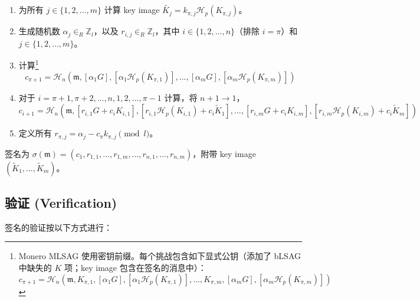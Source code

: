 \begin{enumerate}
	\item 为所有 \(j \in \{1, 2, ..., m\}\) 计算 key image \(\tilde{K_j} = k_{\pi, j} \mathcal{H}_p(K_{\pi, j})\)。

	\item 生成随机数 \(\alpha_j \in_R \mathbb{Z}_l\)，以及 \(r_{i, j} \in_R \mathbb{Z}_l\)，其中 \(i \in \{1, 2, ..., n\}\)（排除 \(i = \pi\)）和 \(j \in \{1, 2, ..., m\}\)。

	\item 计算\footnote{Monero MLSAG 使用密钥前缀。每个挑战包含如下显式公钥（添加了 bLSAG 中缺失的 $K$ 项；key image 包含在签名的消息中）：\vspace{-.25cm}
	\[c_{\pi+1} = \mathcal{H}_n(\mathfrak{m}, K_{\pi, 1}, [\alpha_1 G], [\alpha_1 \mathcal{H}_p(K_{\pi, 1})], ..., K_{\pi, m}, [\alpha_m G], [\alpha_m \mathcal{H}_p(K_{\pi, m})])
	\]}
	\[c_{\pi+1} = \mathcal{H}_n(\mathfrak{m}, [\alpha_1 G], [\alpha_1 \mathcal{H}_p(K_{\pi, 1})], ..., [\alpha_m G], [\alpha_m \mathcal{H}_p(K_{\pi, m})])\]

	\item 对于 \(i = \pi+1, \pi+2, ..., n, 1, 2, ..., \pi-1\) 计算，将 \(n + 1 \rightarrow 1\)，\vspace{.175cm}
	\[ c_{i+1} = \mathcal{H}_n(\mathfrak{m}, [r_{i, 1} G + c_i K_{i, 1}], [r_{i, 1} \mathcal{H}_p(K_{i, 1}) + c_i \tilde{K}_1], 
	..., [r_{i, m} G + c_i K_{i, m}], [r_{i, m} \mathcal{H}_p(K_{i, m}) + c_i \tilde{K}_m])\]

	\item 定义所有 \(r_{\pi, j} = \alpha_j - c_\pi k_{\pi, j} \pmod l\)。
\end{enumerate}

签名为 \(\sigma(\mathfrak{m}) = (c_1, r_{1, 1}, ..., r_{1, m}, ..., r_{n, 1}, ..., r_{n, m}) \)，附带 key image $(\tilde{K}_1, ...,  \tilde{K}_m)$。



\subsection*{验证 (Verification)}

签名的验证按以下方式进行：

